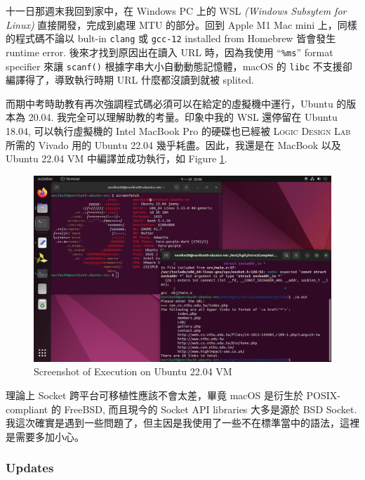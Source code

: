 \documentclass[12pt, a4paper]{article}
\begin{document}
十一日那週末我回到家中，在 Windows PC 上的 WSL \textit{(Windows Subsytem for Linux)} 直接開發，完成到處理 MTU 的部分。回到 Apple M1 Mac mini 上，同樣的程式碼不論以 bult-in \texttt{clang} 或 \texttt{gcc-12} installed from \textsf{Homebrew} 皆會發生 runtime error. 後來才找到原因出在讀入 URL 時，因為我使用 ``\texttt{\%ms}'' format specifier 來讓 \texttt{scanf()} 根據字串大小自動動態記憶體，\textsf{macOS} 的 \texttt{libc} 不支援卻編譯得了，導致執行時期 URL 什麼都沒讀到就被 splited.

而期中考時助教有再次強調程式碼必須可以在給定的虛擬機中運行，\textsf{Ubuntu} 的版本為 20.04. 我完全可以理解助教的考量。印象中我的 WSL 還停留在 \textsf{Ubuntu} 18.04, 可以執行虛擬機的 \textsf{Intel MacBook Pro} 的硬碟也已經被 \textsc{Logic Design Lab} 所需的 \textsf{Vivado} 用的 \textsf{Ubuntu} 22.04 幾乎耗盡。因此，我還是在 MacBook 以及 \textsf{Ubuntu} 22.04 VM 中編譯並成功執行，如 Figure \ref{fig:screenshot_ubuntu}.

\begin{figure}[htbp]
\centering
\includegraphics[width=\linewidth]{screenshot_ubuntu}
\caption{Screenshot of Execution on \textsf{Ubuntu} 22.04 VM}
\label{fig:screenshot_ubuntu}
\end{figure}

理論上 \textsf{Socket} 跨平台可移植性應該不會太差，畢竟 \textsf{macOS} 是衍生於 \textsf{POSIX}-compliant 的 \textsf{FreeBSD}, 而且現今的 \textsf{Socket} API libraries 大多是源於 \textsf{BSD Socket}. 我這次確實是遇到一些問題了，但主因是我使用了一些不在標準當中的語法，這裡是需要多加小心。

\subsubsection{Updates}
\end{document}
